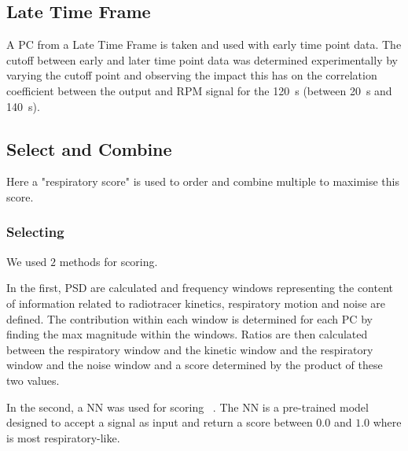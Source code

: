             
    \subsection{Late Time Frame} \label{sec:late_time_frame}
        A \gls{PC} from a Late Time Frame is taken and used with early time point data. The cutoff between early and later time point data was determined experimentally by varying the cutoff point and observing the impact this has on the correlation coefficient between the output and \gls{RPM} signal for the \SI{120}{\second} (between \SI{20}{\second} and \SI{140}{\second}).
        
    
    \subsection{Select and Combine} \label{sec:select_and_combine}
        Here a "respiratory score" is used to order and combine multiple  to maximise this score.
        
        \subsubsection{Selecting } \label{sec:selecting_pcs}
              We used $2$ methods for scoring.
              
              In the first, \gls{PSD} are calculated and frequency windows representing the content of information related to radiotracer kinetics, respiratory motion and noise are defined. The contribution within each window is determined for each \gls{PC} by finding the max magnitude within the windows. Ratios are then calculated between the respiratory window and the kinetic window and the respiratory window and the noise window and a score determined by the product of these two values.
        
        
            In the second, a \gls{NN} was used for scoring ~\cite{Walker2020AutomaticAI}. The \gls{NN} is a pre-trained model designed to accept a signal as input and return a score between $0.0$ and $1.0$ where is most respiratory-like.%
        
